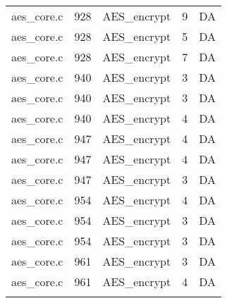 \begin{table}[h]
{\begin{tabular}{clrrr}
aes\_core.c&928&AES\_encrypt&9 &DA\\
aes\_core.c&928&AES\_encrypt&5 &DA\\
aes\_core.c&928&AES\_encrypt&7 &DA\\
aes\_core.c&940&AES\_encrypt&3 &DA\\
aes\_core.c&940&AES\_encrypt&3 &DA\\
aes\_core.c&940&AES\_encrypt&4 &DA\\
aes\_core.c&947&AES\_encrypt&4 &DA\\
aes\_core.c&947&AES\_encrypt&4 &DA\\
aes\_core.c&947&AES\_encrypt&3 &DA\\
aes\_core.c&954&AES\_encrypt&4 &DA\\
aes\_core.c&954&AES\_encrypt&3 &DA\\
aes\_core.c&954&AES\_encrypt&3 &DA\\
aes\_core.c&961&AES\_encrypt&3 &DA\\
aes\_core.c&961&AES\_encrypt&4 &DA\\
&&&&\\
\hline
\end{tabular}
}
\end{table}